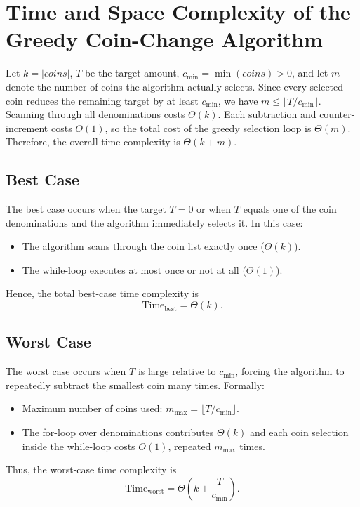 \documentclass[12pt,a4paper]{report}
\begin{document}
\section{Time and Space Complexity of the Greedy Coin-Change Algorithm}

Let \(k = |coins|\), \(T\) be the target amount, \(c_{\min} = \min(coins) > 0\), and let \(m\) denote the number of coins the algorithm actually selects. Since every selected coin reduces the remaining target by at least \(c_{\min}\), we have \(m \le \lfloor T / c_{\min} \rfloor\). Scanning through all denominations costs \(\Theta(k)\). 
Each subtraction and counter-increment costs \(O(1)\), so the total cost of the greedy selection loop is \(\Theta(m)\). Therefore, the overall time complexity is \(\Theta(k + m)\).

\subsection{Best Case}
The best case occurs when the target \(T = 0\) or when \(T\) equals one of the coin denominations and the algorithm immediately selects it. In this case:

\begin{itemize}
    \item The algorithm scans through the coin list exactly once (\(\Theta(k)\)).
    \item The while-loop executes at most once or not at all (\(\Theta(1)\)).
\end{itemize}

Hence, the total best-case time complexity is
\[
\text{Time}_{\text{best}} = \Theta(k).
\]

\subsection{Worst Case}
The worst case occurs when \(T\) is large relative to \(c_{\min}\), forcing the algorithm to repeatedly subtract the smallest coin many times. Formally:

\begin{itemize}
    \item Maximum number of coins used: \(m_{\max} = \lfloor T / c_{\min} \rfloor\).
    \item The for-loop over denominations contributes \(\Theta(k)\) and each coin selection inside the while-loop costs \(O(1)\), repeated \(m_{\max}\) times.
\end{itemize}

Thus, the worst-case time complexity is
\[
\text{Time}_{\text{worst}} = \Theta\!\left(k + \frac{T}{c_{\min}}\right).
\]
\end{document}
